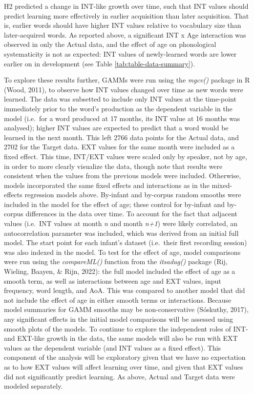 \documentclass[
  man]{apa6}
\begin{document}
H2 predicted a change in INT-like growth over time, such that INT values should predict learning more effectively in earlier acquisition than later acquisition. That is, earlier words should have higher INT values relative to vocabulary size than later-acquired words. As reported above, a significant INT x Age interaction was observed in only the Actual data, and the effect of age on phonological systematicity is not as expected: INT values of newly-learned words are lower earlier on in development (see Table \ref{tab:table-data-summary}).

To explore these results further, GAMMs were run using the \emph{mgcv()} package in R (Wood, 2011), to observe how INT values changed over time as new words were learned. The data was subsetted to include only INT values at the time-point immediately prior to the word's production as the dependent variable in the model (i.e.~for a word produced at 17 months, its INT value at 16 months was analysed); higher INT values are expected to predict that a word would be learned in the next month. This left 2766 data points for the Actual data, and 2702 for the Target data. EXT values for the same month were included as a fixed effect. This time, INT/EXT values were scaled only by speaker, not by age, in order to more clearly visualize the data, though note that results were consistent when the values from the previous models were included. Otherwise, models incorporated the same fixed effects and interactions as in the mixed-effects regression models above. By-infant and by-corpus random smooths were included in the model for the effect of age; these control for by-infant and by-corpus differences in the data over time. To account for the fact that adjacent values (i.e.~INT values at month \emph{n} and month \emph{n+1}) were likely correlated, an autocorrelation parameter was included, which was derived from an initial full model. The start point for each infant's dataset (i.e.~their first recording session) was also indexed in the model. To test for the effect of age, model comparisons were run using the \emph{compareML()} function from the \emph{itsadug()} package (Rij, Wieling, Baayen, \& Rijn, 2022): the full model included the effect of age as a smooth term, as well as interactions between age and EXT values, input frequency, word length, and AoA. This was compared to another model that did not include the effect of age in either smooth terms or interactions. Because model summaries for GAMM smooths may be non-conservative (Sóskuthy, 2017), any significant effects in the initial model comparisons will be assessed using smooth plots of the models. To continue to explore the independent roles of INT- and EXT-like growth in the data, the same models will also be run with EXT values as the dependent variable (and INT values as a fixed effect). This component of the analysis will be exploratory given that we have no expectation as to how EXT values will affect learning over time, and given that EXT values did not significantly predict learning. As above, Actual and Target data were modeled separately.
\end{document}
